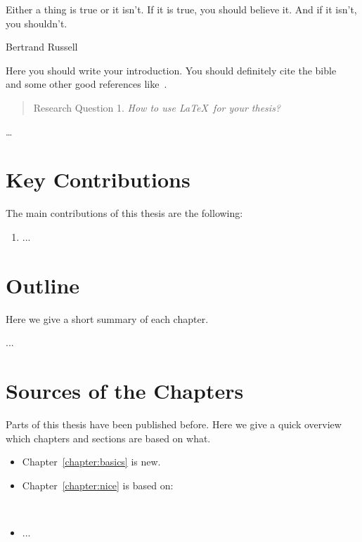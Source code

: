 
\introduction

\setlength{\epigraphwidth}{5.5cm}
\epigraph{Either a thing is true or it isn't.
If it is true, you should believe it.
And if it isn't, you shouldn't.}{Bertrand Russell}

\noindent
Here you should write your introduction. %
You should definitely cite the bible~\cite{BRV} and some other
good references like~\cite{Littlewood1953:amm}.

\begin{quote}
Research Question 1.\newline
\emph{How to use \LaTeX\ for your thesis?}
\end{quote}

\dots %

\clearpage
\section*{Key Contributions}

The main contributions of this thesis are the following:

\begin{enumerate}
  \item ...
\end{enumerate}


\clearpage
\section*{Outline}

Here we give a short summary of each chapter.

... %

\section*{Sources of the Chapters}

Parts of this thesis have been published before.
Here we give a quick overview which chapters and sections are based on what.

\begin{itemize}
\item Chapter~\ref{chapter:basics} is new.

\item Chapter~\ref{chapter:nice} is based on:

  ~\cite{Nobody2018:Where}

\item ...
\end{itemize}
